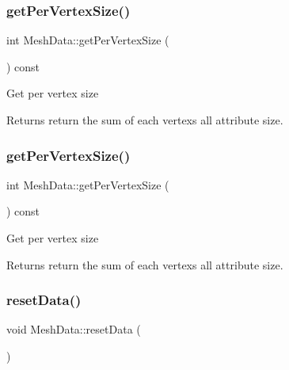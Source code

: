 \subsubsection{\texorpdfstring{get\+Per\+Vertex\+Size()}{getPerVertexSize()}\hspace{0.1cm}{\footnotesize\ttfamily [1/2]}}
{\footnotesize\ttfamily int Mesh\+Data\+::get\+Per\+Vertex\+Size (\begin{DoxyParamCaption}{ }\end{DoxyParamCaption}) const\hspace{0.3cm}{\ttfamily [inline]}}

Get per vertex size \begin{DoxyReturn}{Returns}
return the sum of each vertex\textquotesingle{}s all attribute size. 
\end{DoxyReturn}
\mbox{\label{structMeshData_ae20d2a9e24fc7f28a873b264bc85236a}} 
\subsubsection{\texorpdfstring{get\+Per\+Vertex\+Size()}{getPerVertexSize()}\hspace{0.1cm}{\footnotesize\ttfamily [2/2]}}
{\footnotesize\ttfamily int Mesh\+Data\+::get\+Per\+Vertex\+Size (\begin{DoxyParamCaption}{ }\end{DoxyParamCaption}) const\hspace{0.3cm}{\ttfamily [inline]}}

Get per vertex size \begin{DoxyReturn}{Returns}
return the sum of each vertex\textquotesingle{}s all attribute size. 
\end{DoxyReturn}
\mbox{\label{structMeshData_adea2eaa8437f832a94e288862087845b}} 
\subsubsection{\texorpdfstring{reset\+Data()}{resetData()}\hspace{0.1cm}{\footnotesize\ttfamily [1/2]}}
{\footnotesize\ttfamily void Mesh\+Data\+::reset\+Data (\begin{DoxyParamCaption}{ }\end{DoxyParamCaption})\hspace{0.3cm}{\ttfamily [inline]}}

